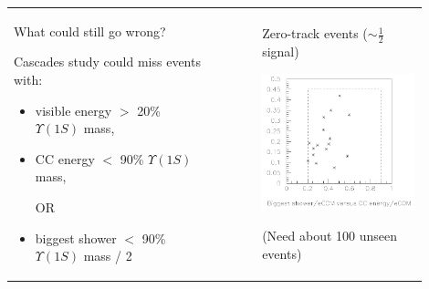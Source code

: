 \documentclass[landscape]{article}
\begin{document}
\begin{tabular}{p{0.5\linewidth} c p{0.4\linewidth}}
  \begin{minipage}{\linewidth}
    What could still go wrong?

    \bigskip
    
    Cascades study could miss events with:

    \begin{itemize}

      \item visible energy $>$ 20\% $\Upsilon(1S)$ mass,

      \item CC energy $<$ 90\% $\Upsilon(1S)$ mass,

\begin{center} OR \end{center}

      \item biggest shower $<$ 90\% $\Upsilon(1S)$ mass / 2

    \end{itemize}

  \end{minipage} & \mbox{\hspace{0.5 cm}} &
  \begin{minipage}{\linewidth}
    \begin{center}
      Zero-track events ($\sim\frac{1}{2}$ signal)

      \medskip

      \mbox{\hspace{0.5 cm}} \includegraphics[width=0.9\linewidth]{cascade_still_missing3_tt.pdf}

      \medskip

      (Need about 100 unseen events)
    \end{center}
  \end{minipage}
\end{tabular}
\end{document}
